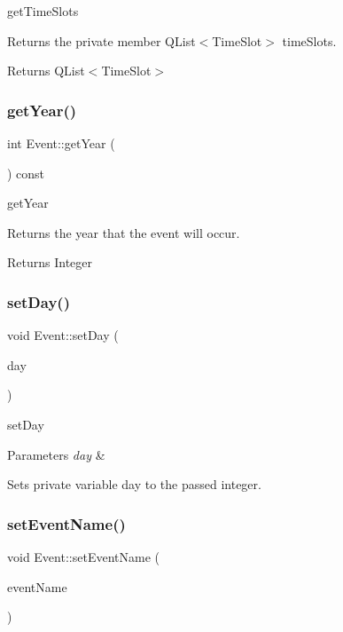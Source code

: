get\+Time\+Slots 

Returns the private member Q\+List$<$\+Time\+Slot$>$ time\+Slots. \begin{DoxyReturn}{Returns}
Q\+List$<$\+Time\+Slot$>$ 
\end{DoxyReturn}
\mbox{\label{class_event_a7ddd7775953aeeb58d311d52139c2844}} 
\subsubsection{\texorpdfstring{get\+Year()}{getYear()}}
{\footnotesize\ttfamily int Event\+::get\+Year (\begin{DoxyParamCaption}{ }\end{DoxyParamCaption}) const}



get\+Year 

Returns the year that the event will occur. \begin{DoxyReturn}{Returns}
Integer 
\end{DoxyReturn}
\mbox{\label{class_event_a94940b483087e30b440ff2579b285d9c}} 
\subsubsection{\texorpdfstring{set\+Day()}{setDay()}}
{\footnotesize\ttfamily void Event\+::set\+Day (\begin{DoxyParamCaption}\item[{int}]{day }\end{DoxyParamCaption})}



set\+Day 


\begin{DoxyParams}{Parameters}
{\em day} & \\
\hline
\end{DoxyParams}
Sets private variable day to the passed integer. \mbox{\label{class_event_a15b675acab68dd6a840421ec72aeef57}} 
\subsubsection{\texorpdfstring{set\+Event\+Name()}{setEventName()}}
{\footnotesize\ttfamily void Event\+::set\+Event\+Name (\begin{DoxyParamCaption}\item[{Q\+String}]{event\+Name }\end{DoxyParamCaption})}




